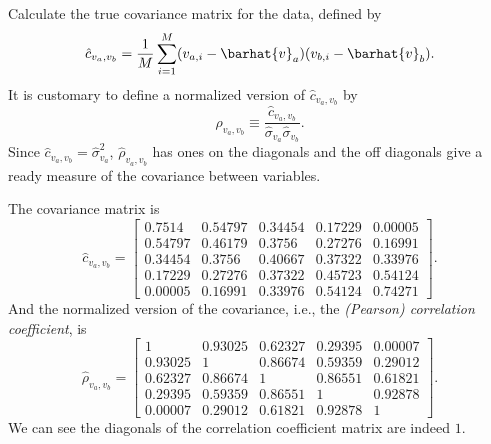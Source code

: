 \Question{} Calculate the true covariance matrix for the data, defined by
%
\begin{equation}
    \hat{c}_{v_a, v_b} = \frac{ 1 }{ M }
    \sum_{i=1}^M (v_{a,i} - \barhat{v}_a) (v_{b,i} - \barhat{v}_b).
\end{equation}
%
It is customary to define a normalized version of \(\hat{c}_{v_a, v_b}\) by
%
\begin{equation}
    \hat{\rho}_{v_a, v_b} \equiv \frac{ \hat{c}_{v_a, v_b} }{ \hat{\sigma}_{v_a} \hat{\sigma}_{v_b} }.
\end{equation}
%
Since \(\hat{c}_{v_a, v_b} = \hat{\sigma}_{v_a}^2\),
\(\hat{\rho}_{v_a, v_b}\) has ones on the diagonals and the off diagonals give a
ready measure of the covariance between variables.

\Answer{}
The covariance matrix is
%
\begin{equation}
    \hat{c}_{v_a, v_b} =
    \begin{bmatrix}
        0.7514  & 0.54797 & 0.34454 & 0.17229 & 0.00005 \\
        0.54797 & 0.46179 & 0.3756  & 0.27276 & 0.16991 \\
        0.34454 & 0.3756  & 0.40667 & 0.37322 & 0.33976 \\
        0.17229 & 0.27276 & 0.37322 & 0.45723 & 0.54124 \\
        0.00005 & 0.16991 & 0.33976 & 0.54124 & 0.74271
    \end{bmatrix}.
\end{equation}
%
And the normalized version of the covariance, i.e., the
\emph{(Pearson) correlation coefficient}, is
%
\begin{equation}
    \hat{\rho}_{v_a, v_b} =
    \begin{bmatrix}
        1       & 0.93025 & 0.62327 & 0.29395 & 0.00007 \\
        0.93025 & 1       & 0.86674 & 0.59359 & 0.29012 \\
        0.62327 & 0.86674 & 1       & 0.86551 & 0.61821 \\
        0.29395 & 0.59359 & 0.86551 & 1       & 0.92878 \\
        0.00007 & 0.29012 & 0.61821 & 0.92878 & 1
    \end{bmatrix}.
\end{equation}
%
We can see the diagonals of the correlation coefficient matrix are indeed \(1\).
